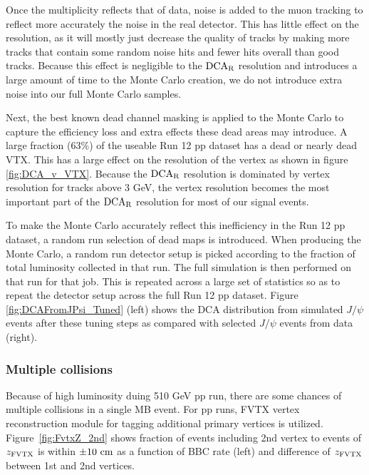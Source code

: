 \documentclass[12pt]{article}
\newcommand{\jpsi}{$J/\psi$ }
\newcommand{\dcar}{$\rm{DCA}_{R}$ }
\newcommand{\fvtxz}{$z_{\rm FVTX}$ }
\begin{document}


Once the multiplicity reflects that of data, noise is added to the muon tracking to reflect more accurately the noise in the real detector. 
This has little effect on the resolution, as it will mostly just decrease the quality of tracks by making more tracks that contain
some random noise hits and fewer hits overall than good tracks.  Because this effect is negligible to the \dcar resolution and introduces
a large amount of time to the Monte Carlo creation, we do not introduce extra noise into our full Monte Carlo samples.  

Next, the best known dead channel masking is applied to the Monte Carlo to capture the efficiency loss and extra effects these dead areas may introduce.
A large fraction (63\%) of the useable Run 12 pp dataset has a dead or nearly dead VTX.  This has a large effect on the resolution
of the vertex as shown in figure \ref{fig:DCA_v_VTX}.  Because the \dcar resolution is dominated by vertex resolution for tracks above 3 GeV,
the vertex resolution becomes the most important part of the \dcar resolution for most of our signal events.  

To make the Monte Carlo  accurately reflect this inefficiency in the Run 12 pp dataset, a random run selection of dead maps is introduced.  
When producing the Monte Carlo, a random run detector setup is picked according to the fraction of total luminosity collected in that run.  
The full simulation is then performed on that run for that job.  This is repeated across a large set of statistics so as to repeat the detector 
setup across the full Run 12 pp dataset. Figure \ref{fig:DCAFromJPsi_Tuned} (left) shows the DCA distribution from simulated \jpsi events 
after these tuning steps as compared with selected \jpsi events from data (right). 
\subsubsection{Multiple collisions}
Because of high luminosity duing 510 GeV pp run, there are some chances of multiple collisions in a single MB event. 
For pp runs, FVTX vertex reconstruction module for tagging additional primary vertices is utilized.
Figure~\ref{fig:FvtxZ_2nd} shows fraction of events including 2nd vertex to events of \fvtxz is within $\pm10~{\rm cm}$ as a function of BBC rate (left) and difference of \fvtxz between 1st and 2nd vertices. 
\end{document}
